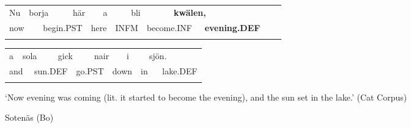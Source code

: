 \begin{tabular}{llllllllllllll}
\lsptoprule
Nu & \multicolumn{2}{l}{borja

} & \multicolumn{2}{l}{här

} & \multicolumn{2}{l}{a

} & \multicolumn{2}{l}{bli

} & \multicolumn{2}{l}{{\bfseries kwälen,}

} & \multicolumn{2}{l}{} & \\
\multicolumn{2}{l}{now

} & \multicolumn{2}{l}{begin.PST

} & \multicolumn{2}{l}{here

} & \multicolumn{2}{l}{INFM

} & \multicolumn{2}{l}{become.INF

} & \multicolumn{2}{l}{{\bfseries evening.DEF}

} & \multicolumn{2}{l}{}\\
\lspbottomrule
\end{tabular}

\begin{tabular}{llllllllllll}
\lsptoprule
a & \multicolumn{2}{l}{sola

} & \multicolumn{2}{l}{gick

} & \multicolumn{2}{l}{nair

} & \multicolumn{2}{l}{i

} & \multicolumn{2}{l}{sjön.

} & \\
\multicolumn{2}{l}{and

} & \multicolumn{2}{l}{sun.DEF

} & \multicolumn{2}{l}{go.PST

} & \multicolumn{2}{l}{down

} & \multicolumn{2}{l}{in

} & \multicolumn{2}{l}{lake.DEF

}\\
\lspbottomrule
\end{tabular}

\begin{styleTranslation}
‘Now evening was coming (lit. it started to become the evening), and the sun set in the lake.’ (Cat Corpus)

\end{styleTranslation}

\begin{listWWNumileveli}
\item {}

\begin{styleExample}
Sotenäs (Bo)

\end{styleExample}

\end{listWWNumileveli}

